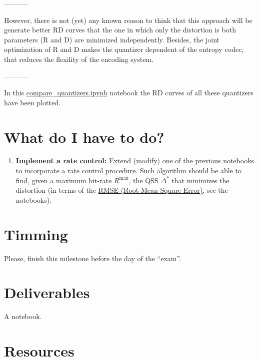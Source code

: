 -----------

However, there is not
(yet) any known reason to think that this approach will be generate
better RD curves that the one in which only the distortion is both parameters (R and D) are
minimized independently. Besides, the joint optimization of R and D
makes the quantizer dependent of the entropy codec, that reduces the
flexility of the encoding system.

-----------

In this
\href{https://github.com/Sistemas-Multimedia/Sistemas-Multimedia.github.io/blob/master/contents/gray_SQ/compare_quantizers.ipynb}{compare\_quantizers.ipynb}
notebook the RD curves of all these quantizers have been plotted.


\section{What do I have to do?}
\begin{enumerate}
\item \textbf{Implement a rate control:} Extend (modify) one of the
  previous notebooks to incorporate a rate control procedure. Such
  algorithm should be able to find, given a maximum bit-rate
  $R^{\text{max}}$, the QSS $\Delta^*$ that minimizes the distortion (in
  terms of the
  \href{https://en.wikipedia.org/wiki/Root-mean-square_deviation}{RMSE
    (Root Mean Square Error)}, see the notebooks).
\end{enumerate}

\section{Timming}
Please, finish this milestone before the day of the ``exam''.

\section{Deliverables}
A notebook.

\section{Resources}
\renewcommand{\addcontentsline}[3]{} %



